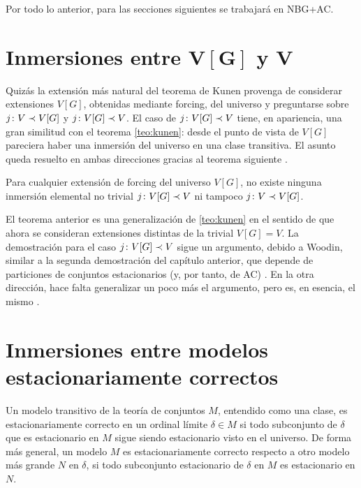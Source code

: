 \documentclass
[
  12pt,
  letterpaper,
  openany,
  oneside,
]{book}
\begin{document}
Por todo lo anterior, para las secciones siguientes se trabajará en NBG+AC.

\section{Inmersiones entre $\symbf{V[G]}$ y $\symbf{V}$}

Quizás la extensión más natural del teorema de Kunen provenga de considerar
extensiones $V[G]$, obtenidas mediante forcing, del universo y preguntarse sobre
$j\colon V\prec V[G]$ y $j\colon V[G]\prec V$.
El caso de $j\colon V[G]\prec V$ tiene, en apariencia, una gran similitud con
el teorema \ref{teo:kunen}: desde el punto de vista de $V[G]$ pareciera
haber una inmersión del universo en una clase transitiva.
El asunto queda resuelto en ambas direcciones gracias al teorema siguiente
\autocite[Teoremas 5 y 7]{hamkins_generalizations_2012}.

\begin{teo}\label{teo:kunen-forcing}
    Para cualquier extensión de forcing del universo $V[G]$,
    no existe ninguna inmersión elemental no trivial $j\colon V[G]\prec V$
    ni tampoco $j\colon V\prec V[G]$.
\end{teo}

El teorema anterior es una generalización de \ref{teo:kunen}
en el sentido de que ahora se consideran extensiones distintas de la trivial $V[G]=V$.
La demostración para el caso $j\colon V[G]\prec V$ sigue un argumento,
debido a Woodin, similar a la segunda demostración del capítulo anterior,
que depende de particiones de conjuntos estacionarios (y, por tanto, de AC)
\autocite[1876]{hamkins_generalizations_2012}.
En la otra dirección, hace falta generalizar un poco más el argumento, pero es, en esencia,
el mismo \autocite[1877]{hamkins_generalizations_2012}.

\section{Inmersiones entre modelos estacionariamente correctos}

Un modelo transitivo de la teoría de conjuntos $M$, entendido como una clase,
es estacionariamente correcto en un ordinal límite $\delta\in M$ si todo subconjunto
de $\delta$ que es estacionario en $M$ sigue siendo estacionario visto en el universo.
De forma más general, un modelo $M$ es estacionariamente correcto respecto a otro modelo
más grande $N$ en $\delta$, si todo subconjunto estacionario de $\delta$ en $M$ es estacionario en $N$.
\end{document}

